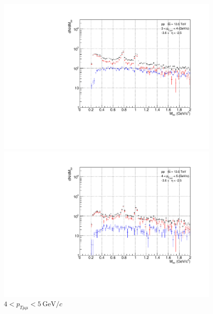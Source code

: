 \begin{figure}[H]
                    \\
                    \vspace{1em}
                    \begin{minipage}{0.45\textwidth}
                        \centering
                        \includegraphics[width=\textwidth]{fig/3_4_1_CB_pt_3to4.pdf}
                        \caption*{$3 < p_{T\mu\mu} < 4\ \mathrm{GeV}/c$}
                    \end{minipage}
                    \hfill
                    \begin{minipage}{0.45\textwidth}
                        \centering
                        \includegraphics[width=\textwidth]{fig/3_4_1_CB_pt_4to5.pdf}
                        \caption*{$4 < p_{T\mu\mu} < 5\ \mathrm{GeV}/c$}
                    \end{minipage}

\end{figure}
